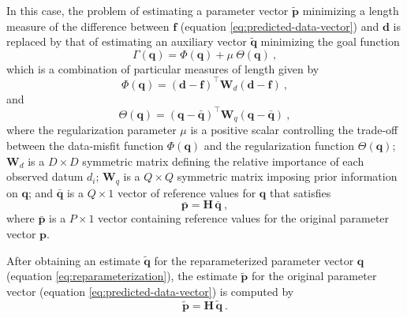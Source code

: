 \documentclass[utf8]{FrontiersinHarvard} %
\begin{document}
	In this case, the problem of estimating a parameter vector $\tilde{\mathbf{p}}$ minimizing a length 
	measure of the difference between $\mathbf{f}$ (equation \ref{eq:predicted-data-vector}) and $\mathbf{d}$
	is replaced by that of estimating an auxiliary vector $\tilde{\mathbf{q}}$ minimizing the goal function
	\begin{equation}
		\Gamma(\mathbf{q}) = \Phi(\mathbf{q}) + \mu \: \Theta(\mathbf{q}) \: ,
		\label{eq:function-Gamma}
	\end{equation}
	which is a combination of particular measures of length given by
	\begin{equation}
		\Phi(\mathbf{q}) = \left( \mathbf{d} - \mathbf{f} \right)^{\top}\mathbf{W}_{d}\left( \mathbf{d} - \mathbf{f} \right) \: ,
		\label{eq:function-Phi}
	\end{equation}
	and
	\begin{equation}
		\Theta(\mathbf{q}) = \left( \mathbf{q} - \bar{\mathbf{q}} \right)^{\top}\mathbf{W}_{q}\left( \mathbf{q} - \bar{\mathbf{q}} \right) \: ,
		\label{eq:function-Theta}
	\end{equation}
	where the regularization parameter $\mu$ is a positive scalar controlling the trade-off between the data-misfit function 
	$\Phi(\mathbf{q})$ and the regularization function $\Theta(\mathbf{q})$; 
	$\mathbf{W}_{d}$ is a $D \times D$ symmetric matrix defining the relative importance of each observed datum $d_{i}$;
	$\mathbf{W}_{q}$ is a $Q \times Q$ symmetric matrix imposing prior information on $\mathbf{q}$;
	and $\bar{\mathbf{q}}$ is a $Q \times 1$ vector of reference values for $\mathbf{q}$ that satisfies
	\begin{equation}
		\bar{\mathbf{p}} = \mathbf{H} \, \bar{\mathbf{q}} \: ,
		\label{eq:reparameterization-reference}
	\end{equation}
	where $\bar{\mathbf{p}}$ is a $P \times 1$ vector containing reference values
	for the original parameter vector $\mathbf{p}$.
	
	After obtaining an estimate $\tilde{\mathbf{q}}$ for the reparameterized parameter vector $\mathbf{q}$ (equation \ref{eq:reparameterization}), 
	the estimate $\tilde{\mathbf{p}}$ for the original parameter vector 
	(equation \ref{eq:predicted-data-vector}) is computed by 
	\begin{equation}
		\tilde{\mathbf{p}} = \mathbf{H} \, \tilde{\mathbf{q}} \: .
		\label{eq:vector-p-tilde}
	\end{equation}
	
\end{document}
